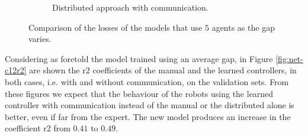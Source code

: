 \begin{figure}[!htb]
\begin{center}
\begin{subfigure}[h]{0.49\textwidth}
			\caption{Distributed approach with communication.}
		\end{subfigure}	
	\end{center}
	\vspace{-0.5cm}
	\caption{Comparison of the losses of the models that use $5$ agents as the gap 
		varies.}
	\label{fig:commlossn5}
\end{figure}

Considering as foretold the model trained using an average gap, in Figure 
\ref{fig:net-c12r2} are shown the \gls{r2} coefficients of the manual and the 
learned controllers, in both cases, i.e. with and without communication, on the 
validation sets.
From these figures we expect that the behaviour of the robots using the 
learned controller with communication instead of the manual or the 
distributed alone is better, even if far from the expert. The new model produces 
an increase in the coefficient \gls{r2} from $0.41$ to $0.49$.
